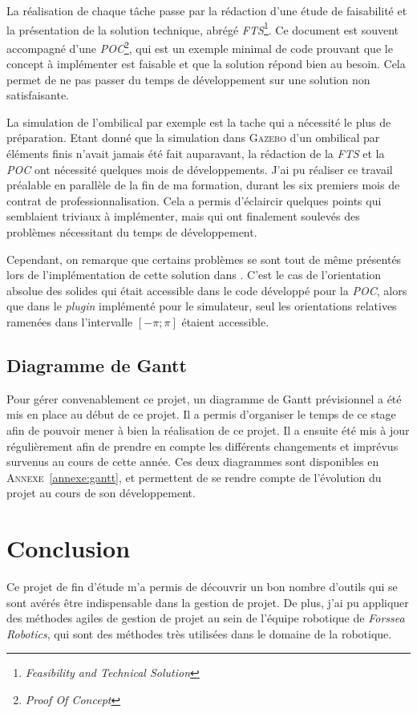 			La réalisation de chaque tâche passe par la rédaction d'une étude de faisabilité et la présentation de la solution technique, abrégé \textit{FTS}\footnote{\textit{Feasibility and Technical Solution}}. Ce document est souvent accompagné d'une \textit{POC}\footnote{\textit{Proof Of Concept}}, qui est un exemple minimal de code prouvant que le concept à implémenter est faisable et que la solution répond bien au besoin. Cela permet de ne pas passer du temps de développement sur une solution non satisfaisante.

			La simulation de l'ombilical par exemple est la tache qui a nécessité le plus de préparation. Etant donné que la simulation dans \textsc{Gazebo} d'un ombilical par éléments finis n'avait jamais été fait auparavant, la rédaction de la \textit{FTS} et la \textit{POC} ont nécessité quelques mois de développements. J'ai pu réaliser ce travail préalable en parallèle de la fin de ma formation, durant les six premiers mois de contrat de professionnalisation. Cela a permis d'éclaircir quelques points qui semblaient triviaux à implémenter, mais qui ont finalement soulevés des problèmes nécessitant du temps de développement. 
			
			Cependant, on remarque que certains problèmes se sont tout de même présentés lors de l'implémentation de cette solution dans \gazebo{}. C'est le cas de l'orientation absolue des solides qui était accessible dans le code développé pour la \textit{POC}, alors que dans le \textit{plugin} implémenté pour le simulateur, seul les orientations relatives ramenées dans l'intervalle $[-\pi; \pi]$ étaient accessible.

		\subsection{Diagramme de Gantt}
			
			Pour gérer convenablement ce projet, un diagramme de Gantt prévisionnel a été mis en place au début de ce projet. Il a permis d'organiser le temps de ce stage afin de pouvoir mener à bien la réalisation de ce projet. Il a ensuite été mis à jour régulièrement afin de prendre en compte les différents changements et imprévus survenus au cours de cette année. Ces deux diagrammes sont disponibles en \textsc{Annexe}~\ref{annexe:gantt}, et permettent de se rendre compte de l'évolution du projet au cours de son développement.

	\section{Conclusion}
	
		Ce projet de fin d'étude m'a permis de découvrir un bon nombre d'outils qui se sont avérés être indispensable dans la gestion de projet. De plus, j'ai pu appliquer des méthodes agiles de gestion de projet au sein de l'équipe robotique de \textit{Forssea Robotics}, qui sont des méthodes très utilisées dans le domaine de la robotique.